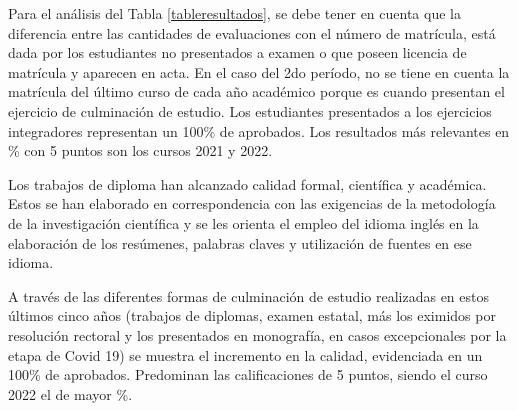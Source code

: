 Para el análisis del Tabla \ref{tableresultados}, se debe tener en cuenta que la diferencia entre las cantidades de evaluaciones con el número de matrícula, está dada por los estudiantes no presentados a examen o que poseen licencia de matrícula y aparecen en acta. En el caso del 2do período, no se tiene en cuenta la matrícula del último curso de cada año académico porque es cuando presentan el ejercicio de culminación de estudio. Los estudiantes presentados a los ejercicios integradores representan un 100\% de aprobados. Los resultados más relevantes en \% con 5 puntos son los cursos 2021 y 2022.

Los trabajos de diploma han alcanzado calidad formal, científica y académica. Estos se han elaborado en correspondencia con las exigencias de la metodología de la investigación científica y se les orienta el empleo del idioma inglés en la elaboración de los resúmenes, palabras claves y utilización de fuentes en ese idioma.

A través de las diferentes formas de culminación de estudio realizadas en estos últimos cinco años (trabajos de diplomas, examen estatal, más los eximidos por resolución rectoral y los presentados en monografía, en casos excepcionales por la etapa de Covid 19) se muestra el incremento en la calidad, evidenciada en un 100\% de aprobados. Predominan las calificaciones de 5 puntos, siendo el curso 2022 el de mayor \%. 

